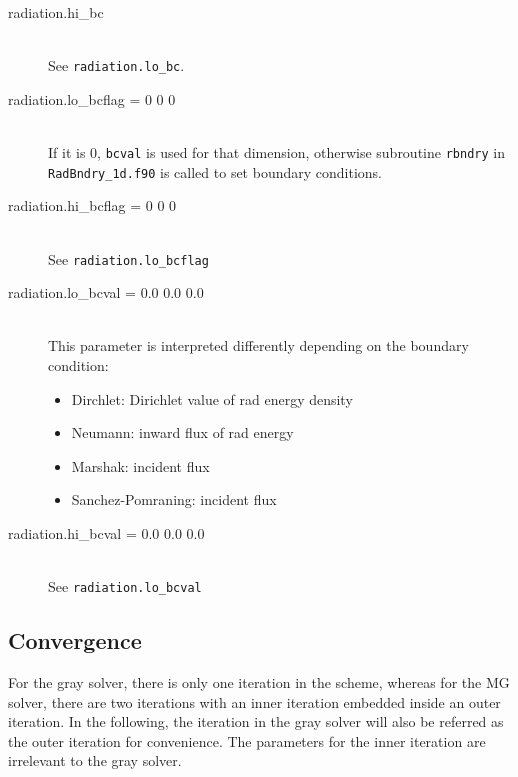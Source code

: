 \documentclass[11pt,letterpaper]{article}
\begin{document}
\begin{description}
\begin{itemize}
  \end{itemize}
\item[radiation.hi\_bc] \hfill \\
  See {\tt radiation.lo\_bc}.
\item[radiation.lo\_bcflag = 0 0 0] \hfill \\
  If it is 0, {\tt bcval} is used for that dimension, otherwise 
  subroutine {\tt rbndry} in {\tt RadBndry\_1d.f90} is called to set
  boundary conditions.
\item[radiation.hi\_bcflag = 0 0 0] \hfill \\
  See {\tt radiation.lo\_bcflag}
\item[radiation.lo\_bcval = 0.0 0.0 0.0] \hfill \\
  This parameter is interpreted differently depending on the boundary
  condition:
  \begin{itemize}
    \item Dirchlet: Dirichlet value of rad energy density
    \item Neumann:  inward flux of rad energy
    \item Marshak:  incident flux
    \item Sanchez-Pomraning: incident flux
  \end{itemize}
\item[radiation.hi\_bcval = 0.0 0.0 0.0] \hfill \\
  See {\tt radiation.lo\_bcval}
\end{description}

\subsection{Convergence}

For the gray solver, there is only one iteration in the scheme,
whereas for the MG solver, there are two iterations with an inner
iteration embedded inside an outer iteration.  In the following, the
iteration in the gray solver will also be referred as the outer
iteration for convenience.  The parameters for the inner iteration are
irrelevant to the gray solver.  
\end{document}

